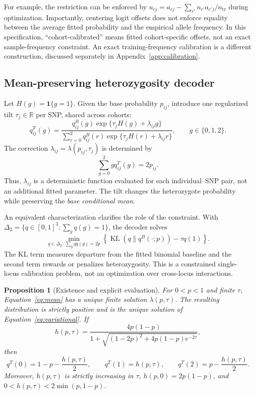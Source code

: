 \documentclass[11pt,a4paper]{article}
\newtheorem{proposition}{Proposition}
\newcommand{\KL}{\operatorname{KL}}
\newcommand{\tr}{\mathrm{tr}}
\newcommand{\ind}{\mathbf{1}}
\begin{document}
For example, the restriction can be enforced by
$u_{cj}=a_{cj}-\sum_{c'}n_{c'}a_{c'j}/n_{\tr}$ during optimization.
Importantly, centering logit offsets does not enforce equality between the
average fitted probability and the empirical allele frequency. In this
specification, ``cohort-calibrated'' means fitted cohort-specific offsets,
not an exact sample-frequency constraint. An exact training-frequency
calibration is a different construction, discussed separately in
Appendix~\ref{app:calibration}.

\subsection{Mean-preserving heterozygosity decoder}
\label{sec:tilt}

Let $H(g)=\ind\{g=1\}$. Given the base probability $p_{ij}$, introduce one
regularized tilt $\tau_j\in\mathbb R$ per SNP, shared across cohorts:
\begin{equation}
 q^T_{ij}(g)=
 \frac{q^B_{ij}(g)\exp\{\tau_jH(g)+\lambda_{ij}g\}}
      {\sum_{r=0}^{2}q^B_{ij}(r)\exp\{\tau_jH(r)+\lambda_{ij}r\}},
 \qquad g\in\{0,1,2\}.
 \label{eq:tilt}
\end{equation}
The correction $\lambda_{ij}=\lambda(p_{ij},\tau_j)$ is determined by
\begin{equation}
 \sum_{g=0}^{2}gq^T_{ij}(g)=2p_{ij}.
 \label{eq:mean}
\end{equation}
Thus, $\lambda_{ij}$ is a deterministic function evaluated for each
individual--SNP pair, not an additional fitted parameter. The tilt changes
the heterozygote probability while preserving the \emph{base conditional mean}.

An equivalent characterization clarifies the role of the constraint. With
$\Delta_2=\{q\in[0,1]^3:\sum_gq(g)=1\}$, the decoder solves
\begin{equation}
 \min_{q\in\Delta_2:\,\sum_g gq(g)=2p}
 \left\{\KL(q\|q^B(\cdot;p))-\tau q(1)\right\}.
 \label{eq:variational}
\end{equation}
The KL term measures departure from the fitted binomial baseline and the
second term rewards or penalizes heterozygosity. This is a constrained
single-locus calibration problem, not an optimization over cross-locus
interactions.

\begin{proposition}[Existence and explicit evaluation]
\label{prop:tilt}
For $0<p<1$ and finite $\tau$, Equation~\eqref{eq:mean} has a unique finite
solution $\lambda(p,\tau)$. The resulting distribution is strictly positive and
is the unique solution of Equation~\eqref{eq:variational}. If
\begin{equation}
 h(p,\tau)=
 \frac{4p(1-p)}
 {1+\sqrt{(1-2p)^2+4p(1-p)e^{-2\tau}}},
 \label{eq:hetero}
\end{equation}
then
\begin{equation}
 q^T(0)=1-p-\frac{h(p,\tau)}2,\qquad
 q^T(1)=h(p,\tau),\qquad
 q^T(2)=p-\frac{h(p,\tau)}2.
 \label{eq:explicit}
\end{equation}
Moreover, $h(p,\tau)$ is strictly increasing in $\tau$,
$h(p,0)=2p(1-p)$, and
$0<h(p,\tau)<2\min(p,1-p)$.
\end{proposition}
\end{document}
